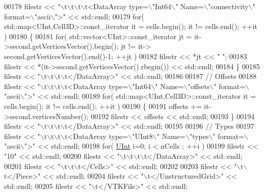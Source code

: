 \begin{DoxyCode}
00178     filestr << \textcolor{stringliteral}{"\(\backslash\)t\(\backslash\)t\(\backslash\)t\(\backslash\)t<DataArray type=\(\backslash\)"Int64\(\backslash\)" Name=\(\backslash\)"connectivity\(\backslash\)" format=\(\backslash\)"ascii\(\backslash\)">"} << std::endl;
00179     \textcolor{keywordflow}{for}( std::map<UInt,Cell3D>::const\_iterator it = cells.begin(); it != cells.end(); ++it )
00180     \{
00181         \textcolor{keywordflow}{for}( std::vector<UInt>::const\_iterator jt = it->second.getVerticesVector().begin(); jt != it->
      second.getVerticesVector().end()-1; ++jt )
00182             filestr << *jt << \textcolor{stringliteral}{" "};
00183         filestr << *(it->second.getVerticesVector().rbegin()) << std::endl;
00184     \}
00185     filestr << \textcolor{stringliteral}{"\(\backslash\)t\(\backslash\)t\(\backslash\)t\(\backslash\)t</DataArray>"} << std::endl;
00186 
00187     \textcolor{comment}{//  Offsets}
00188     filestr << \textcolor{stringliteral}{"\(\backslash\)t\(\backslash\)t\(\backslash\)t\(\backslash\)t<DataArray type=\(\backslash\)"Int64\(\backslash\)" Name=\(\backslash\)"offsets\(\backslash\)" format=\(\backslash\)"ascii\(\backslash\)">"} << std::endl;
00189     \textcolor{keywordflow}{for}( std::map<UInt,Cell3D>::const\_iterator it = cells.begin(); it != cells.end(); ++it )
00190     \{
00191         offsets += it->second.verticesNumber();
00192         filestr << offsets << std::endl;
00193     \}
00194     filestr << \textcolor{stringliteral}{"\(\backslash\)t\(\backslash\)t\(\backslash\)t\(\backslash\)t</DataArray>"} << std::endl;
00195 
00196     \textcolor{comment}{//  Types}
00197     filestr << \textcolor{stringliteral}{"\(\backslash\)t\(\backslash\)t\(\backslash\)t\(\backslash\)t<DataArray type=\(\backslash\)"UInt8\(\backslash\)" Name=\(\backslash\)"types\(\backslash\)" format=\(\backslash\)"ascii\(\backslash\)">"} << std::endl;
00198     \textcolor{keywordflow}{for}( \hyperlink{namespaceFVCode3D_a4bf7e328c75d0fd504050d040ebe9eda}{UInt} i=0; i < nCells ; ++i )
00199         filestr << \textcolor{stringliteral}{"10"} << std::endl;
00200     filestr << \textcolor{stringliteral}{"\(\backslash\)t\(\backslash\)t\(\backslash\)t\(\backslash\)t</DataArray>"} << std::endl;
00201     filestr << \textcolor{stringliteral}{"\(\backslash\)t\(\backslash\)t\(\backslash\)t</Cells>"} << std::endl;
00202 
00203     filestr << \textcolor{stringliteral}{"\(\backslash\)t\(\backslash\)t</Piece>"} << std::endl;
00204     filestr << \textcolor{stringliteral}{"\(\backslash\)t</UnstructuredGrid>"} << std::endl;
00205     filestr << \textcolor{stringliteral}{"\(\backslash\)t</VTKFile>"} << std::endl;

\end{DoxyCode}
